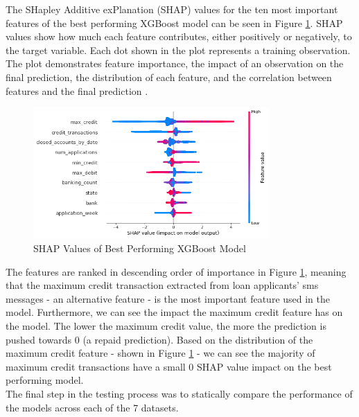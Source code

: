 The SHapley Additive exPlanation (SHAP) values for the ten most important features of the best performing XGBoost model can be seen in Figure \ref{fig:xgb_feats}. SHAP values show how much each feature contributes, either positively or negatively, to the target variable. Each dot shown in the plot represents a training observation. The plot demonstrates feature importance, the impact of an observation on the final prediction, the distribution of each feature, and the correlation between features and the final prediction \parencite{SHAP}. 

\vspace{10 pt}

\begin{figure}[!htb]
\centering
\includegraphics[width=0.8\textwidth]{images/xgb_feats.png}
\caption{SHAP Values of Best Performing XGBoost Model}
\label{fig:xgb_feats}
\end{figure}

\vspace{10 pt}

The features are ranked in descending order of importance in Figure \ref{fig:xgb_feats}, meaning that the maximum credit transaction extracted from loan applicants' sms messages - an alternative feature - is the most important feature used in the model. Furthermore, we can see the impact the maximum credit feature has on the model. The lower the maximum credit value, the more the prediction is pushed towards 0 (a repaid prediction). Based on the distribution of the maximum credit feature - shown in Figure \ref{fig:xgb_feats} - we can see the majority of maximum credit transactions have a small 0 SHAP value impact on the best performing model.  \\

The final step in the testing process was to statically compare the performance of the models across each of the 7 datasets.


